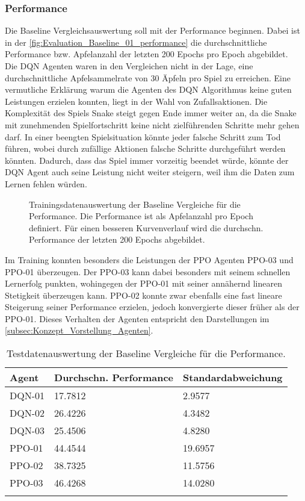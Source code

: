 \subsubsection{Performance}
Die Baseline Vergleichsauswertung soll mit der Performance beginnen. Dabei ist in der \autoref{fig:Evaluation_Baseline_01_performance} die durchschnittliche Performance bzw. Apfelanzahl der letzten 200 Epochs pro Epoch abgebildet.\\
Die DQN Agenten waren in den Vergleichen nicht in der Lage, eine durchschnittliche Apfelsammelrate von 30 Äpfeln pro Spiel zu erreichen. 
Eine vermutliche Erklärung warum die Agenten des DQN Algorithmus keine guten Leistungen erzielen konnten, liegt in der Wahl von Zufallsaktionen. Die Komplexität des Spiels Snake steigt gegen Ende immer weiter an, da die Snake mit zunehmenden Spielfortschritt keine nicht zielführenden Schritte mehr gehen darf. In einer beengten Spielsituation könnte jeder falsche Schritt zum Tod führen, wobei durch zufällige Aktionen falsche Schritte durchgeführt werden könnten. Dadurch, dass das Spiel immer vorzeitig beendet würde, könnte der DQN Agent auch seine Leistung nicht weiter steigern, weil ihm die Daten zum Lernen fehlen würden.
\begin{figure}[H]
	\centering
	
	\caption[Performance - Auswertung der Trainingsdaten der Baseline Vergleiche]{Trainingsdatenauswertung der Baseline Vergleiche für die Performance. Die Performance ist als Apfelanzahl pro Epoch definiert. Für einen besseren Kurvenverlauf wird die durchschn. Performance der letzten 200 Epochs abgebildet.}
	\label{fig:Evaluation_Baseline_01_performance}
\end{figure}
Im Training konnten besonders die Leistungen der PPO Agenten PPO-03 und PPO-01 überzeugen. 
Der PPO-03 kann dabei besonders mit seinem schnellen Lernerfolg punkten, wohingegen der PPO-01 mit seiner annähernd linearen Stetigkeit überzeugen kann.
PPO-02 konnte zwar ebenfalls eine fast lineare Steigerung seiner Performance erzielen, jedoch konvergierte dieser früher als der PPO-01.
Dieses Verhalten der Agenten entspricht den Darstellungen im \autoref{subsec:Konzept_Vorstellung_Agenten}.
\begin{longtable}[H]{|p{4.5cm}|p{4.5cm}|p{4.5cm}|}
	\hline
	Agent & Durchschn. Performance & Standardabweichung \\
	\hline
	DQN-01 & 17.7812 & 2.9577 \\
	\hline
	DQN-02 & 26.4226 & 4.3482 \\
	\hline
	DQN-03 & 25.4506 & 4.8280 \\
	\hline
	PPO-01 & 44.4544 & 19.6957 \\
	\hline
	PPO-02 & 38.7325 & 11.5756 \\
	\hline
	PPO-03 & 46.4268 & 14.0280 \\
	\hline
\caption{Testdatenauswertung der Baseline Vergleiche für die Performance.}
\label{tab:Evaluation_Testdaten_Performance} 
\end{longtable}
